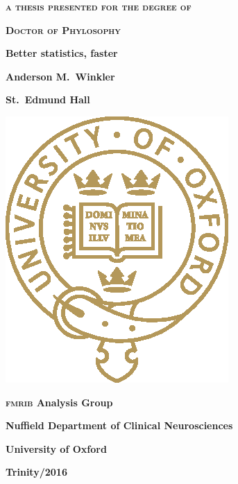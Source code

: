 \pagestyle{empty}
\begin{center}
\textbf{\textsc{a thesis presented for the degree of}}

\textbf{\textsc{Doctor of Phylosophy}}

\vspace*{\fill}

\begin{Huge}
{\color{oxblue}\textbf{Better statistics, faster}}
\end{Huge}

\vspace*{\fill}

\textbf{Anderson M.\ Winkler}

\textbf{St.\ Edmund Hall}

\vspace*{\fill}

\includegraphics[scale=1.6]{figures/ox_logo_special_gold_pos.eps}

\vspace*{\fill}

\textbf{\textsc{fmrib} Analysis Group}

\textbf{Nuffield Department of Clinical Neurosciences}

\textbf{University of Oxford}

\vspace*{\fill}

\textbf{Trinity/2016}
\end{center}

\cleardoublepage
{}
\renewcommand\abstractname{{\Large Abstract}}
\begin{abstract}
\ldots
\end{abstract}
